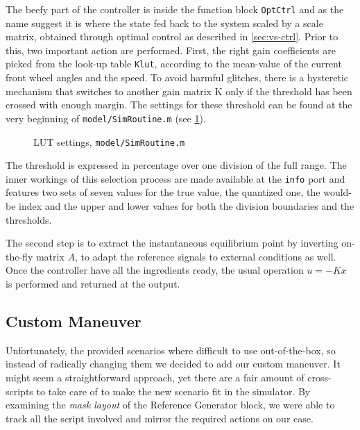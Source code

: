 		The beefy part of the controller is inside the function block \lstinline{OptCtrl} and as the name suggest it is where the state fed back to the system scaled by a scale matrix,
		obtained through optimal control as described in \vref{sec:vs-ctrl}. Prior to this, two important action are performed.
		First, the right gain coefficients are picked from the look-up table \lstinline{Klut}, according to the mean-value of the current front wheel angles and the speed.
		To avoid harmful glitches, there is a hysteretic mechanism that switches to another gain matrix K only if the threshold has been crossed with enough margin.
		The settings for these threshold can be found at the very beginning of \texttt{model/SimRoutine.m} (see \ref{lst:vs-thrs}).
		\begin{figure}
			\centering
			
			\caption{LUT settings, \texttt{model/SimRoutine.m}}
			\label{lst:vs-thrs}
		\end{figure}
		The threshold is expressed in percentage over one division of the full range. The inner workings of this selection process are made available at the \lstinline{info} port
		and features two sets of seven values for the true value, the quantized one, the would-be index and the upper and lower values for both the division boundaries and
		the thresholds.
		
		The second step is to extract the instantaneous equilibrium point by inverting on-the-fly matrix $A$, to adapt the reference signals to external conditions as well.
		Once the controller have all the ingredients ready, the usual operation $u = -Kx$ is performed and returned at the output.


		\subsection{Custom Maneuver}
		\label{ssec:vs-int-cm}

		Unfortunately, the provided scenarios where difficult to use out-of-the-box, so instead of radically changing them we decided to add our custom maneuver.
		It might seem a straightforward approach, yet there are a fair amount of cross-scripts to take care of to make the new scenario fit in the simulator.
		By examining the \emph{mask layout} of the Reference Generator block, we were able to track all the script involved and mirror the required actions on our case.
		
